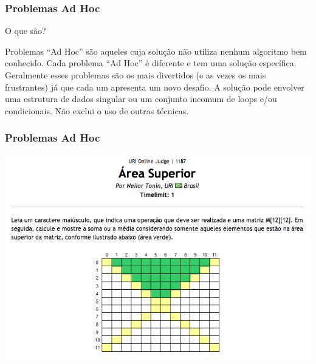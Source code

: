 \begin{frame}
\frametitle{Problemas Ad Hoc}
\begin{block}{O que são?}
\begin{itemize}
	\bitem Problemas ``Ad Hoc'' são aqueles cuja solução não utiliza nenhum algoritmo bem conhecido.
	\bitem Cada problema ``Ad Hoc'' é diferente e tem uma solução específica.
	\bitem Geralmente esses problemas são os mais divertidos (e as vezes os mais frustrantes) já que cada um apresenta um novo desafio.
	\bitem A solução pode envolver uma estrutura de dados singular ou um conjunto incomum de loops e/ou condicionais.
	\bitem Não exclui o uso de outras técnicas.
\end{itemize}
\end{block}
\end{frame}
\begin{frame}
\frametitle{Problemas Ad Hoc}
\begin{center}
	\includegraphics[width=.85\textwidth]{figuras/URI-1187.png}
\end{center}
\end{frame}	
